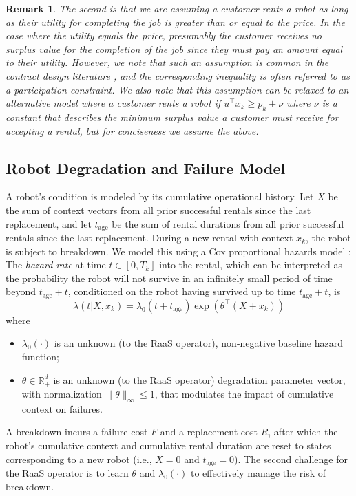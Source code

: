 \documentclass[letterpaper, 10 pt, conference]{IEEEconf}
\newtheorem{remark}{Remark}
\begin{document}
\begin{remark}
The second is that we are assuming a customer rents a robot as long as their utility for completing the job is greater than \emph{or equal to} the price. In the case where the utility equals the price, presumably the customer receives no surplus value for the completion of the job since they must pay an amount equal to their utility. However, we note that such an assumption is common in the contract design literature \cite{laffont2002theory}, and the corresponding inequality is often referred to as a \emph{participation constraint}. We also note that this assumption can be relaxed to an alternative model where a customer rents a robot if $u^\top x_k \geq p_k + \nu$ where $\nu$ is a constant that describes the minimum surplus value a customer must receive for accepting a rental, but for conciseness we assume the above.
\end{remark}

\subsection{Robot Degradation and Failure Model}
A robot's condition is modeled by its cumulative operational history. Let $X$ be the sum of context vectors from all prior successful rentals since the last replacement, and let $t_{\text{age}}$ be the sum of rental durations from all prior successful rentals since the last replacement. During a new rental with context $x_k$, the robot is subject to breakdown. We model this using a Cox proportional hazards model \cite{cox1972regression,kumar1994proportional}: The \emph{hazard rate} at time $t \in [0, T_k]$ into the rental, which can be interpreted as the probability the robot will not survive in an infinitely small period of time beyond $t_{\text{age}} + t$, conditioned on the robot having survived up to time $t_{\text{age}} + t$, is
\begin{equation}
    \lambda(t | X, x_k) = \lambda_0(t + t_{\text{age}}) \exp(\theta^\top (X + x_k))
\end{equation}
where
\begin{itemize}
    \item $\lambda_0(\cdot)$ is an unknown (to the RaaS operator), non-negative baseline hazard function;
    \item $\theta \in \mathbb{R}_+^d$ is an unknown (to the RaaS operator) degradation parameter vector, with normalization $\|\theta\|_\infty \leq 1$, that modulates the impact of cumulative context on failures.
\end{itemize}
A breakdown incurs a failure cost $F$ and a replacement cost $R$, after which the robot's cumulative context and cumulative rental duration are reset to states corresponding to a new robot (i.e., $X=0$ and $t_{\text{age}} = 0$). The second challenge for the RaaS operator is to learn $\theta$ and $\lambda_0(\cdot)$ to effectively manage the risk of breakdown.
\end{document}
